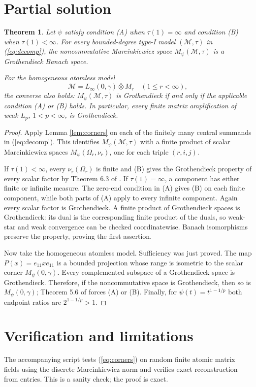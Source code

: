 \documentclass[10pt]{article}
\newtheorem{theorem}{Theorem}
\newcommand{\M}{\mathcal M}
\begin{document}
\section{Partial solution}
\begin{theorem}\label{thm:main}
Let $\psi$ satisfy condition (A) when $\tau(1)=\infty$ and condition (B)
when $\tau(1)<\infty$.  For every bounded-degree type-I model
$(\M,\tau)$ in (\ref{eq:decomp}), the noncommutative Marcinkiewicz space
$M_\psi(\M,\tau)$ is a Grothendieck Banach space.

For the homogeneous atomless model
\[
 \M=L_\infty(0,\gamma)\overline\otimes M_r
 \quad (1\le r<\infty),
\]
the converse also holds: $M_\psi(\M,\tau)$ is Grothendieck if and only if
the applicable condition (A) or (B) holds.  In particular, every finite
matrix amplification of weak $L_p$, $1<p<\infty$, is Grothendieck.
\end{theorem}

\begin{proof}
Apply Lemma \ref{lem:corners} on each of the finitely many central summands
in (\ref{eq:decomp}).  This identifies $M_\psi(\M,\tau)$ with a finite
product of scalar Marcinkiewicz spaces
$M_\psi(\Omega_r,\nu_r)$, one for each triple $(r,i,j)$.

If $\tau(1)<\infty$, every $\nu_r(\Omega_r)$ is finite and (B) gives the
Grothendieck property of every scalar factor by Theorem 6.3 of \cite{DPS}.
If $\tau(1)=\infty$, a component has either finite or infinite measure.  The
zero-end condition in (A) gives (B) on each finite component, while both
parts of (A) apply to every infinite component.  Again every scalar factor
is Grothendieck.  A finite product of Grothendieck spaces is Grothendieck:
its dual is the corresponding finite product of the duals, so weak-star and
weak convergence can be checked coordinatewise.  Banach isomorphisms preserve
the property, proving the first assertion.

Now take the homogeneous atomless model.  Sufficiency was just proved.  The
map $P(x)=e_{11}xe_{11}$ is a bounded projection whose range is isometric to
the scalar corner $M_\psi(0,\gamma)$.  Every complemented subspace of a
Grothendieck space is Grothendieck.  Therefore, if the noncommutative space is
Grothendieck, then so is $M_\psi(0,\gamma)$; Theorem 5.6 of \cite{DPS}
forces (A) or (B).  Finally, for $\psi(t)=t^{1-1/p}$ both endpoint ratios are
$2^{1-1/p}>1$.
\end{proof}

\section{Verification and limitations}
The accompanying script tests (\ref{eq:corners}) on random finite atomic
matrix fields using the discrete Marcinkiewicz norm and verifies exact
reconstruction from entries.  This is a sanity check; the proof is exact.
\end{document}
